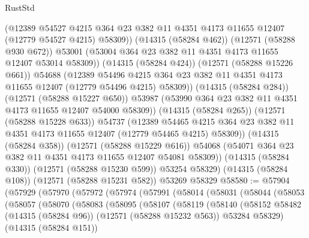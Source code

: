 \begin{lexlean}{RustStd}
\begin{coremodule}
                  (@12389
                    @54527
                    @4215
                    @364
                    @23
                    @382
                    @11
                    @4351
                    @4173
                    @11655
                    @12407
                    (@12779 @54527 @4215)
                    @58309))
                (@14315 (@58284 @462))
                (@12571 (@58288 @930 @672))
                @53001
                (@53004 @364 @23 @382 @11 @4351 @4173 @11655 @12407 @53014 @58309))
              (@14315 (@58284 @424))
              (@12571 (@58288 @15226 @661))
              @54688
              (@12389
                @54496
                @4215
                @364
                @23
                @382
                @11
                @4351
                @4173
                @11655
                @12407
                (@12779 @54496 @4215)
                @58309))
            (@14315 (@58284 @284))
            (@12571 (@58288 @15227 @650))
            @53987
            (@53990 @364 @23 @382 @11 @4351 @4173 @11655 @12407 @54000 @58309))
          (@14315 (@58284 @265))
          (@12571 (@58288 @15228 @633))
          @54737
          (@12389
            @54465
            @4215
            @364
            @23
            @382
            @11
            @4351
            @4173
            @11655
            @12407
            (@12779 @54465 @4215)
            @58309))
        (@14315 (@58284 @358))
        (@12571 (@58288 @15229 @616))
        @54068
        (@54071 @364 @23 @382 @11 @4351 @4173 @11655 @12407 @54081 @58309))
      (@14315 (@58284 @330))
      (@12571 (@58288 @15230 @599))
      @53254
      @58329)
    (@14315 (@58284 @108))
    (@12571 (@58288 @15231 @582))
    @53269
    @58329
@58580 := @57904
    (@57929
      (@57970
        (@57972
          (@57974
            (@57991
              (@58014
                (@58031
                  (@58044
                    (@58053
                      (@58057
                        (@58070
                          (@58083
                            (@58095
                              (@58107
                                (@58119
                                  (@58140
                                    (@58152
                                      @58482
                                      (@14315 (@58284 @96))
                                      (@12571 (@58288 @15232 @563))
                                      @53284
                                      @58329)
                                    (@14315 (@58284 @151))

\end{coremodule}
\end{lexlean}
